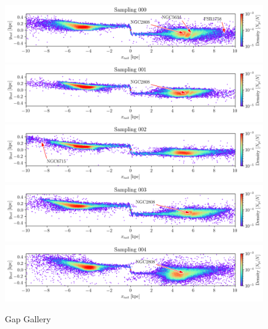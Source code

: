 \documentclass[draft]{aa}
\begin{document}
\begin{appendix}
    \begin{figure}
      \centering
      \includegraphics[width=\linewidth]{gallery_of_gaps_monte-carlo-000.png}
      \includegraphics[width=\linewidth]{gallery_of_gaps_monte-carlo-001.png}
      \includegraphics[width=\linewidth]{gallery_of_gaps_monte-carlo-002.png}
      \includegraphics[width=\linewidth]{gallery_of_gaps_monte-carlo-003.png}
      \includegraphics[width=\linewidth]{gallery_of_gaps_monte-carlo-004.png}
      \caption{Gap Gallery}
      \label{fig:TailCoordinates}
    \end{figure}    



\end{appendix}
\end{document}
